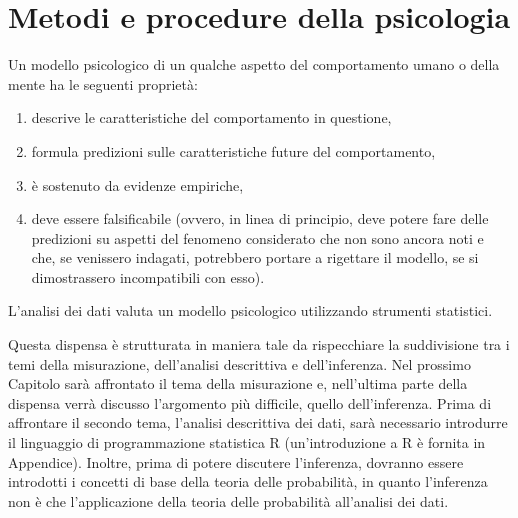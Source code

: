 \documentclass[
  11pt,
]{krantz}
\providecommand{\tightlist}{%
  \setlength{\itemsep}{0pt}\setlength{\parskip}{0pt}}
\theoremstyle{definition}
\theoremstyle{definition}
\theoremstyle{definition}
\theoremstyle{definition}
\theoremstyle{remark}
\begin{document}
\hypertarget{metodi-e-procedure-della-psicologia}{%
\section{Metodi e procedure della psicologia}\label{metodi-e-procedure-della-psicologia}}

Un modello psicologico di un qualche aspetto del comportamento umano o della mente ha le seguenti proprietà:

\begin{enumerate}
\def\labelenumi{\arabic{enumi}.}
\tightlist
\item
  descrive le caratteristiche del comportamento in questione,
\item
  formula predizioni sulle caratteristiche future del comportamento,
\item
  è sostenuto da evidenze empiriche,
\item
  deve essere falsificabile (ovvero, in linea di principio, deve potere fare delle predizioni su aspetti del fenomeno considerato che non sono ancora noti e che, se venissero indagati, potrebbero portare a rigettare il modello, se si dimostrassero incompatibili con esso).
\end{enumerate}

\noindent L'analisi dei dati valuta un modello psicologico utilizzando strumenti statistici.

Questa dispensa è strutturata in maniera tale da rispecchiare la suddivisione tra i temi della misurazione, dell'analisi descrittiva e dell'inferenza. Nel prossimo Capitolo sarà affrontato il tema della misurazione e, nell'ultima parte della dispensa verrà discusso l'argomento più difficile, quello dell'inferenza. Prima di affrontare il secondo tema, l'analisi descrittiva dei dati, sarà necessario introdurre il linguaggio di programmazione statistica R (un'introduzione a R è fornita in Appendice). Inoltre, prima di potere discutere l'inferenza, dovranno essere introdotti i concetti di base della teoria delle probabilità, in quanto l'inferenza non è che l'applicazione della teoria delle probabilità all'analisi dei dati.

\backmatter

  

\printindex
\end{document}
